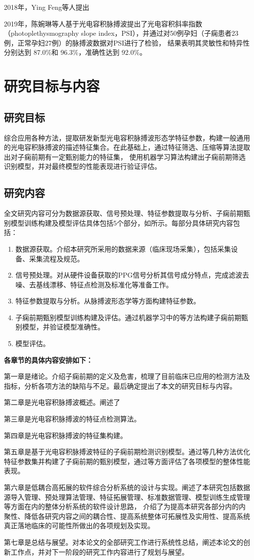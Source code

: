 2018年，Ying Feng等人提出

2019年，陈婉琳等人\cite{Chen2019}基于光电容积脉搏波提出了光电容积斜率指数（photoplethysmography slope index，PSI），并通过对50例孕妇（子痫患者23例，正常孕妇27例）的脉搏波数据对PSI进行了检验，
结果表明其灵敏性和特异性分别达到 87.0\%和 96.3\%，准确性达到 92.0\%。

\section{研究目标与内容}

\subsection{研究目标}
综合应用各种方法，提取研发新型光电容积脉搏波形态学特征参数，构建一般通用的光电容积脉搏波的描述特征集合。在此基础上，通过特征筛选、压缩等算法提取出对子痫前期有一定甄别能力的特征集，
使用机器学习算法构建出子痫前期筛选识别模型，并对最终模型的性能表现进行验证评估。
\subsection{研究内容}
全文研究内容可分为数据源获取、信号预处理、特征参数提取与分析、子痫前期甄别模型训练构建及模型评估具体包括5个部分，如所示。每部分具体研究内容包括：
\begin{enumerate}
    \item 数据源获取。介绍本研究所采用的数据来源（临床现场采集），包括采集设备、采集流程及规范。  
    \item 信号预处理。对从硬件设备获取的PPG信号分析其信号成分特点，完成滤波去噪、去基线漂移、特征点检测及标准化等准备工作。
    \item 特征参数提取与分析。从脉搏波形态学等方面构建特征参数。
    \item 子痫前期甄别模型训练构建及评估。通过机器学习中的等方法构建子痫前期甄别模型，并验证模型准确性。
    \item 模型评估。
\end{enumerate}

\textbf{各章节的具体内容安排如下：}

第一章是绪论。介绍子痫前期的定义及危害，梳理了目前临床已应用的检测方法及指标，分析各项方法的缺陷与不足。最后确定提出了本文的研究目标与内容。

第二章是光电容积脉搏波概述。阐述了

第三章是光电容积脉搏波的特征点检测算法。

第四章是光电容积脉搏波的特征集构建。

第五章是基于光电容积脉搏波特征的子痫前期检测识别模型。通过等几种方法优化特征参数集并构建了子痫前期的甄别模型，通过等方面评估了各项模型的整体性能表现。

第六章是低耦合高拓展的软件综合分析系统的设计与实现。阐述了本研究包括数据源导入管理、预处理算法管理、特征拓展管理、标准数据管理、模型训练生成管理等方面在内的整体分析系统的软件设计思路，
介绍了为提高本研究各部分内的内聚性、降低各研究内容之间的耦合性、提高系统整体可拓展性及实用性、提高系统真正落地临床的可能性所做出的各项规划及实现。

第七章是总结与展望。对本论文的全部研究工作进行系统性总结，阐述本论文的创新工作点，并对下一阶段的研究工作内容进行了规划与展望。